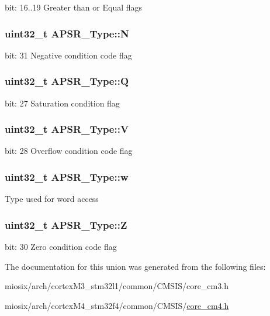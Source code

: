 bit\-: 16..19 Greater than or Equal flags \hypertarget{union_a_p_s_r___type_a7e7bbba9b00b0bb3283dc07f1abe37e0}{
\subsubsection[{N}]{\setlength{\rightskip}{0pt plus 5cm}uint32\-\_\-t A\-P\-S\-R\-\_\-\-Type\-::\-N}}\label{union_a_p_s_r___type_a7e7bbba9b00b0bb3283dc07f1abe37e0}
bit\-: 31 Negative condition code flag \hypertarget{union_a_p_s_r___type_a22d10913489d24ab08bd83457daa88de}{
\subsubsection[{Q}]{\setlength{\rightskip}{0pt plus 5cm}uint32\-\_\-t A\-P\-S\-R\-\_\-\-Type\-::\-Q}}\label{union_a_p_s_r___type_a22d10913489d24ab08bd83457daa88de}
bit\-: 27 Saturation condition flag \hypertarget{union_a_p_s_r___type_a8004d224aacb78ca37774c35f9156e7e}{
\subsubsection[{V}]{\setlength{\rightskip}{0pt plus 5cm}uint32\-\_\-t A\-P\-S\-R\-\_\-\-Type\-::\-V}}\label{union_a_p_s_r___type_a8004d224aacb78ca37774c35f9156e7e}
bit\-: 28 Overflow condition code flag \hypertarget{union_a_p_s_r___type_ae4c2ef8c9430d7b7bef5cbfbbaed3a94}{
\subsubsection[{w}]{\setlength{\rightskip}{0pt plus 5cm}uint32\-\_\-t A\-P\-S\-R\-\_\-\-Type\-::w}}\label{union_a_p_s_r___type_ae4c2ef8c9430d7b7bef5cbfbbaed3a94}
Type used for word access \hypertarget{union_a_p_s_r___type_a3b04d58738b66a28ff13f23d8b0ba7e5}{
\subsubsection[{Z}]{\setlength{\rightskip}{0pt plus 5cm}uint32\-\_\-t A\-P\-S\-R\-\_\-\-Type\-::\-Z}}\label{union_a_p_s_r___type_a3b04d58738b66a28ff13f23d8b0ba7e5}
bit\-: 30 Zero condition code flag 

The documentation for this union was generated from the following files\-:\begin{DoxyCompactItemize}
\item 
miosix/arch/cortex\-M3\-\_\-stm32l1/common/\-C\-M\-S\-I\-S/core\-\_\-cm3.\-h\item 
miosix/arch/cortex\-M4\-\_\-stm32f4/common/\-C\-M\-S\-I\-S/\hyperlink{core__cm4_8h}{core\-\_\-cm4.\-h}\end{DoxyCompactItemize}
